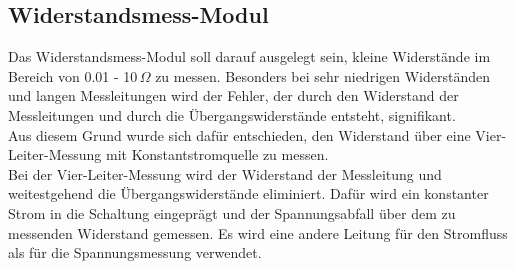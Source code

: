 \subsection{Widerstandsmess-Modul}
Das Widerstandsmess-Modul soll darauf ausgelegt sein, kleine Widerstände im Bereich von 0.01 - 10\,\(\Omega\) zu messen. Besonders bei sehr niedrigen Widerständen und langen Messleitungen wird der Fehler, der durch den Widerstand der Messleitungen und durch die Übergangswiderstände entsteht, signifikant.
\\
Aus diesem Grund wurde sich dafür entschieden, den Widerstand über eine Vier-Leiter-Messung mit Konstantstromquelle zu messen.
\cite[][S. 197]{Schruefer2012}
\\
Bei der Vier-Leiter-Messung wird der Widerstand der Messleitung und weitestgehend die Übergangswiderstände eliminiert. Dafür wird ein konstanter Strom in die Schaltung eingeprägt und der Spannungsabfall über dem zu messenden Widerstand gemessen. Es wird eine andere Leitung für den Stromfluss als für die Spannungsmessung verwendet.

